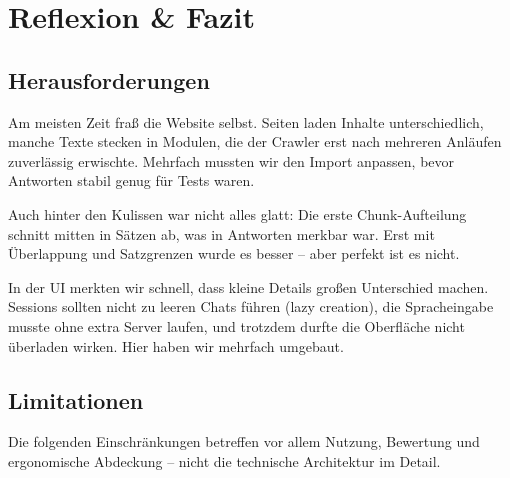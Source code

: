 \section{Reflexion \& Fazit}

\subsection{Herausforderungen}

Am meisten Zeit fraß die Website selbst. Seiten laden Inhalte unterschiedlich, manche Texte stecken in Modulen, die der Crawler erst nach mehreren Anläufen zuverlässig erwischte. Mehrfach mussten wir den Import anpassen, bevor Antworten stabil genug für Tests waren.

Auch hinter den Kulissen war nicht alles glatt: Die erste Chunk-Aufteilung schnitt mitten in Sätzen ab, was in Antworten merkbar war. Erst mit Überlappung und Satzgrenzen wurde es besser -- aber perfekt ist es nicht.

In der UI merkten wir schnell, dass kleine Details großen Unterschied machen. Sessions sollten nicht zu leeren Chats führen (lazy creation), die Spracheingabe musste ohne extra Server laufen, und trotzdem durfte die Oberfläche nicht überladen wirken. Hier haben wir mehrfach umgebaut.

\subsection{Limitationen}

Die folgenden Einschränkungen betreffen vor allem Nutzung, Bewertung und ergonomische Abdeckung -- nicht die technische Architektur im Detail.

